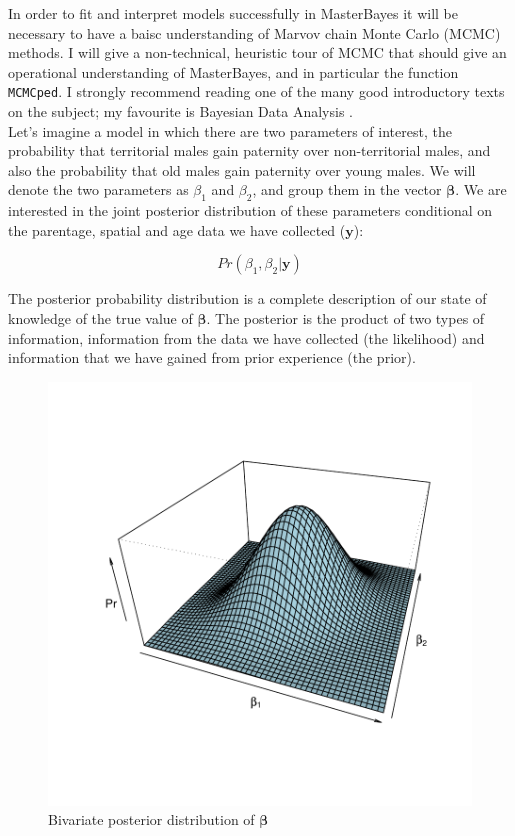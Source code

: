 \documentclass{article}
\begin{document}
In order to fit and interpret models successfully in MasterBayes it will be necessary to have a baisc understanding of Marvov chain Monte Carlo (MCMC) methods.  I will give a non-technical, heuristic tour of MCMC that should give an operational understanding of MasterBayes, and in particular the function \texttt{MCMCped}. I strongly recommend reading one of the many good introductory texts on the subject; my favourite is Bayesian Data Analysis \citep{Gelman.2004}.\\  

Let's imagine a model in which there are two parameters of interest, the probability that territorial males gain paternity over non-territorial males, and also the probability that old males gain paternity over young males.  We will denote the two parameters as $\beta_{1}$ and  $\beta_{2}$, and group them in the vector $\bm{\beta}$.   We are interested in the joint posterior distribution of these parameters conditional on the parentage, spatial and age data we have collected ($\bm{y}$):

\begin{equation}
Pr(\beta_{1}, \beta_{2} | \bm{y})
\end{equation}

The posterior probability distribution is a complete description of our state of knowledge of the true value of $\bm{\beta}$. The posterior is the product of two types of information, information from the data we have collected (the likelihood) and information that we have gained from prior experience (the prior).\\  



\begin{figure}[!h]
\begin{center}
\includegraphics{Tutorial-006}
\end{center}
\caption{Bivariate posterior distribution of $\bm{\beta}$}
\label{densityP}
\end{figure}
\end{document}
